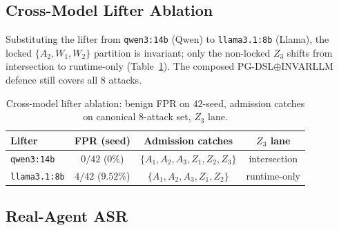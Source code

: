 \subsection{Cross-Model Lifter Ablation}
\label{sec:eval-crossmodel}

Substituting the lifter from \texttt{qwen3:14b} (Qwen) to
\texttt{llama3.1:8b} (Llama), the locked $\{A_2, W_1, W_2\}$ partition
is invariant; only the non-locked $Z_3$ shifts from intersection to
runtime-only (Table~\ref{tbl:cross-lifter}). The composed
PG-DSL$\oplus$INVARLLM defence still covers all $8$ attacks.

\begin{table}[t]
\centering
\footnotesize
\caption{Cross-model lifter ablation: benign FPR on $42$-seed,
admission catches on canonical $8$-attack set, $Z_3$ lane.}
\label{tbl:cross-lifter}
\begin{tabular}{@{}lccc@{}}
\toprule
Lifter & FPR (seed) & Admission catches & $Z_3$ lane \\
\midrule
\texttt{qwen3:14b}    & $0/42$ ($0\%$) & $\{A_1{,}A_2{,}A_3{,}Z_1{,}Z_2{,}Z_3\}$ & intersection \\
\texttt{llama3.1:8b}  & $4/42$ ($9.52\%$) & $\{A_1{,}A_2{,}A_3{,}Z_1{,}Z_2\}$ & runtime-only \\
\bottomrule
\end{tabular}
\end{table}

\subsection{Real-Agent ASR}
\label{sec:eval-real-agent}

